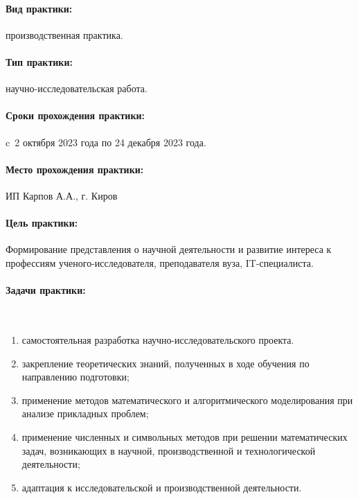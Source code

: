 \documentclass[14pt,Otchet]{diplomwork}
\date{2023}
\author{МКб-3301-51-00}{%
Заботин Михаил Алексеевич
}
\institute{математики и информационных систем}
\begin{document}
\maketitle
\newpage

\tableofcontents


\paragraph{Вид практики:}	производственная практика.

\paragraph{Тип практики:} научно-исследовательская работа.

\paragraph{Сроки прохождения практики:}
	c~2 октября 2023 года по 24 декабря 2023 года.

\paragraph{Место прохождения практики:}
ИП Карпов А.А., г. Киров



\paragraph{Цель практики:}
Формирование  представления о научной деятельности и развитие интереса к профессиям ученого-исследователя, преподавателя вуза, IT-специалиста.

\paragraph{Задачи практики:}~\par
	\begin{enumerate}
		\item  самостоятельная разработка научно-исследовательского проекта.
		\item  закрепление теоретических знаний, полученных в ходе обучения по направлению подготовки;
		\item  применение методов математического и алгоритмического моделирования при анализе прикладных проблем;
		\item  применение численных и символьных методов при решении математических задач, возникающих в научной, производственной и технологической деятельности;
		\item  адаптация к исследовательской и производственной деятельности.
	\end{enumerate}
\end{document}
